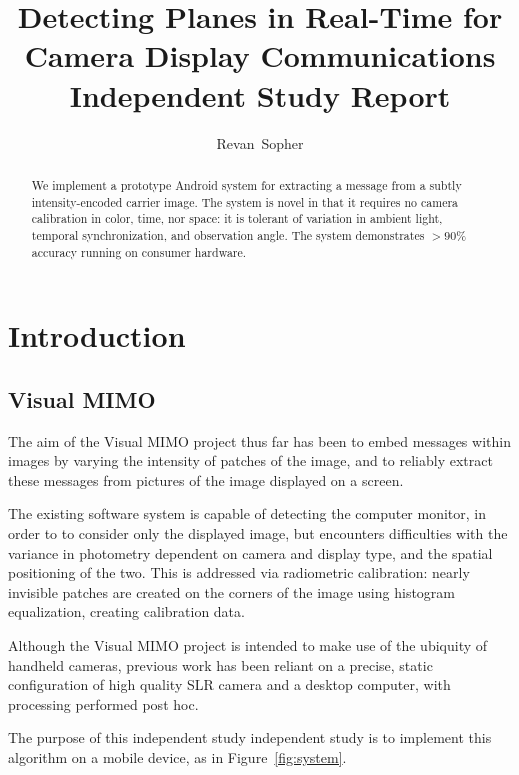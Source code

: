 \documentclass[11pt, letterpaper]{article}
\author{Revan~Sopher}
\title{Detecting Planes in Real-Time for Camera Display Communications\\
{\large Independent Study Report}}
\begin{document}
\maketitle

\begin{abstract}
We implement a prototype Android system for extracting a message from a subtly intensity-encoded carrier image.
The system is novel in that it requires no camera calibration in color, time, nor space: it is tolerant of variation in ambient light, temporal synchronization, and observation angle. The system demonstrates $>90 \%$ accuracy running on consumer hardware.
\end{abstract}

\section{Introduction}

\subsection{Visual MIMO}
The aim of the Visual MIMO project thus far has been to embed messages within images by varying the intensity of patches of the image, and to reliably extract these messages from pictures of the image displayed on a screen.

The existing software system is capable of detecting the computer monitor, in order to to consider only the displayed image, but encounters difficulties with the variance in photometry dependent on camera and display type, and the spatial positioning of the two.
This is addressed via radiometric calibration: nearly invisible patches are created on the corners of the image using histogram equalization, creating calibration data.

Although the Visual MIMO project is intended to make use of the ubiquity of handheld cameras, previous work has been reliant on a precise, static configuration of high quality SLR camera and a desktop computer, with processing performed post hoc.

The purpose of this independent study independent study is to implement this algorithm on a mobile device, as in Figure~\ref{fig:system}.
\end{document}
